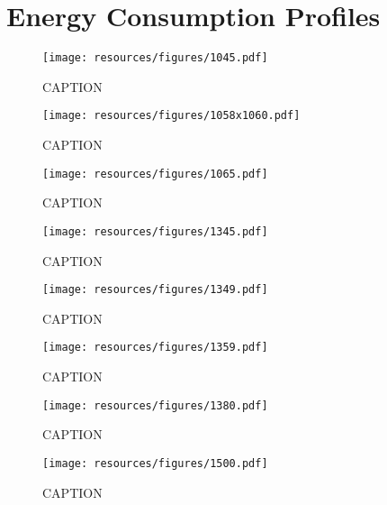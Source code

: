 
\newpage
\section{Energy Consumption Profiles}
\label{sec:app_energy-profiles}

\renewcommand\thefigure{\Alph{section}.\arabic{figure}}
\setcounter{figure}{0}

\begin{figure}[H]
\texttt{[image: resources/figures/1045.pdf]}
\caption{CAPTION}
\label{fig:appendix_1045}
\end{figure}

\begin{figure}[H]
\texttt{[image: resources/figures/1058x1060.pdf]}
\caption{CAPTION}
\label{fig:appendix_1058x1060}
\end{figure}

\begin{figure}[H]
\texttt{[image: resources/figures/1065.pdf]}
\caption{CAPTION}
\label{fig:appendix_1065}
\end{figure}

\begin{figure}[H]
\texttt{[image: resources/figures/1345.pdf]}
\caption{CAPTION}
\label{fig:appendix_1345}
\end{figure}

\begin{figure}[H]
\texttt{[image: resources/figures/1349.pdf]}
\caption{CAPTION}
\label{fig:appendix_1349}
\end{figure}

\begin{figure}[H]
\texttt{[image: resources/figures/1359.pdf]}
\caption{CAPTION}
\label{fig:appendix_1359}
\end{figure}

\begin{figure}[H]
\texttt{[image: resources/figures/1380.pdf]}
\caption{CAPTION}
\label{fig:appendix_1380}
\end{figure}

\begin{figure}[H]
\texttt{[image: resources/figures/1500.pdf]}
\caption{CAPTION}
\label{fig:appendix_1500}
\end{figure}

